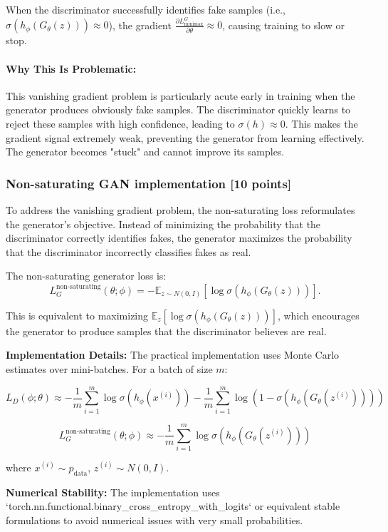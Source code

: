 \documentclass{article}
\begin{document}
When the discriminator successfully identifies fake samples (i.e., $\sigma(h_\phi(G_\theta(z))) \approx 0$), the gradient $\frac{\partial L_{\text{minimax}}^G}{\partial \theta} \approx 0$, causing training to slow or stop.

\paragraph{Why This Is Problematic:} This vanishing gradient problem is particularly acute early in training when the generator produces obviously fake samples. The discriminator quickly learns to reject these samples with high confidence, leading to $\sigma(h) \approx 0$. This makes the gradient signal extremely weak, preventing the generator from learning effectively. The generator becomes "stuck" and cannot improve its samples.

\subsubsection{Non-saturating GAN implementation [10 points]}

To address the vanishing gradient problem, the non-saturating loss reformulates the generator's objective. Instead of minimizing the probability that the discriminator correctly identifies fakes, the generator maximizes the probability that the discriminator incorrectly classifies fakes as real.

The non-saturating generator loss is:
\[
L_G^{\text{non-saturating}}(\theta; \phi) = -\mathbb{E}_{z\sim N(0,I)} [\log \sigma(h_\phi(G_\theta(z)))].
\]

This is equivalent to maximizing $\mathbb{E}_{z} [\log \sigma(h_\phi(G_\theta(z)))]$, which encourages the generator to produce samples that the discriminator believes are real.

\textbf{Implementation Details:} The practical implementation uses Monte Carlo estimates over mini-batches. For a batch of size $m$:

\[
L_D(\phi; \theta) \approx -\frac{1}{m} \sum_{i=1}^m \log \sigma(h_\phi(x^{(i)})) - \frac{1}{m} \sum_{i=1}^m \log(1 - \sigma(h_\phi(G_\theta(z^{(i)}))))
\]

\[
L_G^{\text{non-saturating}}(\theta; \phi) \approx -\frac{1}{m} \sum_{i=1}^m \log \sigma(h_\phi(G_\theta(z^{(i)})))
\]

where $x^{(i)} \sim p_{\text{data}}$, $z^{(i)} \sim N(0,I)$.

\textbf{Numerical Stability:} The implementation uses `torch.nn.functional.binary_cross_entropy_with_logits` or equivalent stable formulations to avoid numerical issues with very small probabilities.
\end{document}
